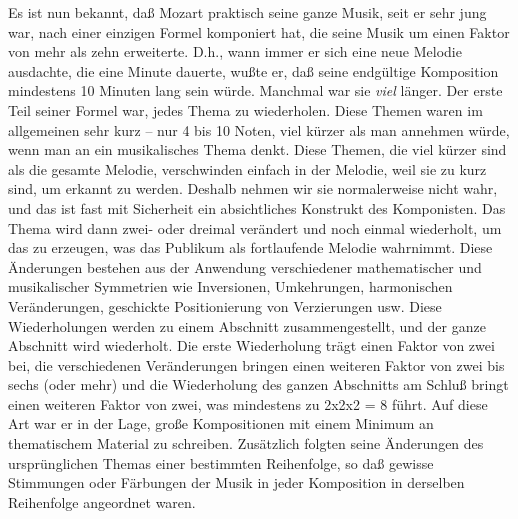 Es ist nun bekannt, daß Mozart praktisch seine ganze Musik, seit er sehr jung war, nach einer einzigen Formel komponiert hat, die seine Musik um einen Faktor von mehr als zehn erweiterte.
D.h., wann immer er sich eine neue Melodie ausdachte, die eine Minute dauerte, wußte er, daß seine endgültige Komposition mindestens 10 Minuten lang sein würde.
Manchmal war sie \textit{viel} länger.
Der erste Teil seiner Formel war, jedes Thema zu wiederholen.
Diese Themen waren im allgemeinen sehr kurz -- nur 4 bis 10 Noten, viel kürzer als man annehmen würde, wenn man an ein musikalisches Thema denkt.
Diese Themen, die viel kürzer sind als die gesamte Melodie, verschwinden einfach in der Melodie, weil sie zu kurz sind, um erkannt zu werden.
Deshalb nehmen wir sie normalerweise nicht wahr, und das ist fast mit Sicherheit ein absichtliches Konstrukt des Komponisten.
Das Thema wird dann zwei- oder dreimal verändert und noch einmal wiederholt, um das zu erzeugen, was das Publikum als fortlaufende Melodie wahrnimmt.
Diese Änderungen bestehen aus der Anwendung verschiedener mathematischer und musikalischer Symmetrien wie Inversionen, Umkehrungen, harmonischen Veränderungen, geschickte Positionierung von Verzierungen usw.
Diese Wiederholungen werden zu einem Abschnitt zusammengestellt, und der ganze Abschnitt wird wiederholt.
Die erste Wiederholung trägt einen Faktor von zwei bei, die verschiedenen Veränderungen bringen einen weiteren Faktor von zwei bis sechs (oder mehr) und die Wiederholung des ganzen Abschnitts am Schluß bringt einen weiteren Faktor von zwei, was mindestens zu 2x2x2 = 8 führt.
Auf diese Art war er in der Lage, große Kompositionen mit einem Minimum an thematischem Material zu schreiben.
Zusätzlich folgten seine Änderungen des ursprünglichen Themas einer bestimmten Reihenfolge, so daß gewisse Stimmungen oder Färbungen der Musik in jeder Komposition in derselben Reihenfolge angeordnet waren.

